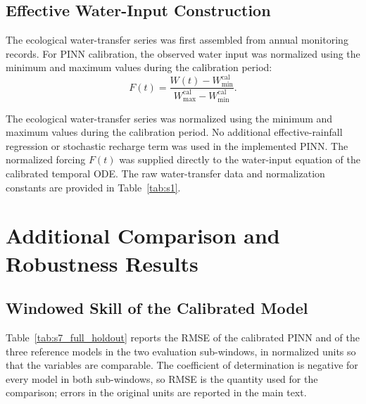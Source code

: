 \documentclass[12pt,a4paper]{article}
\begin{document}
\subsection{Effective Water-Input Construction}

The ecological water-transfer series was first assembled from annual monitoring
records. For PINN calibration, the observed water input was normalized using the
minimum and maximum values during the calibration period:
\begin{equation}
	F(t)=\frac{W(t)-W_{\min}^{\mathrm{cal}}}
	{W_{\max}^{\mathrm{cal}}-W_{\min}^{\mathrm{cal}}}.
\end{equation}

The ecological water-transfer series was normalized using the minimum and
maximum values during the calibration period. No additional effective-rainfall
regression or stochastic recharge term was used in the implemented PINN. The
normalized forcing $F(t)$ was supplied directly to the water-input equation of
the calibrated temporal ODE. The raw water-transfer data and normalization
constants are provided in Table~\ref{tab:s1}.
\section{Additional Comparison and Robustness Results}
\label{sec:s7}

\subsection{Windowed Skill of the Calibrated Model}

Table~\ref{tab:s7_full_holdout} reports the RMSE of the calibrated PINN and of the three reference models in the two evaluation sub-windows, in normalized units so that the variables are comparable. The coefficient of determination is negative for every model in both sub-windows, so RMSE is the quantity used for the comparison; errors in the original units are reported in the main text.
\end{document}
